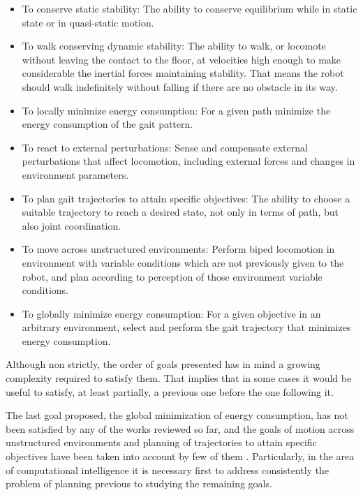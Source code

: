 \begin{itemize}

\item To conserve static stability: The ability to conserve
  equilibrium while in static state or in quasi-static motion.

\item To walk conserving dynamic stability: The ability to walk, or
  locomote without leaving the contact to the floor, at velocities
  high enough to make considerable the inertial forces maintaining
  stability. That means the robot should walk indefinitely without
  falling if there are no obstacle in its way.

\item To locally minimize energy consumption: For a given path
  minimize the energy consumption of the gait pattern.

\item To react to external perturbations: Sense and compensate
  external perturbations that affect locomotion, including external
  forces and changes in environment parameters.

\item To plan gait trajectories to attain specific objectives: The
  ability to choose a suitable trajectory to reach a desired state,
  not only in terms of path, but also joint coordination.

\item To move across unstructured environments: Perform biped
  locomotion in environment with variable conditions which are not
  previously given to the robot, and plan according to perception of
  those environment variable conditions.
\item To globally minimize energy consumption: For a given objective
  in an arbitrary environment, select and perform the gait trajectory
  that minimizes energy consumption.

\end{itemize}


Although non strictly, the order of goals presented has in mind a
growing complexity required to satisfy them. That implies that in some
cases it would be useful to satisfy, at least partially, a previous
one before the one following it.

The last goal proposed, the global minimization of energy consumption,
has not been satisfied by any of the works reviewed so far, and the
goals of motion across unstructured environments and planning of
trajectories to attain specific objectives have been taken into
account by few of them . Particularly, in the area of computational
intelligence it is necessary first to address consistently the problem
of planning previous to studying the remaining goals.


